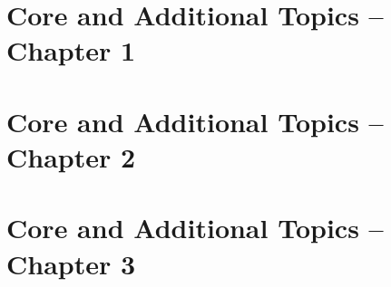 \documentclass[12pt, fleqn, openany, oneside]{studyGuide}
\begin{document}


\chapter{Core and Additional Topics -- Chapter 1}








\chapter{Core and Additional Topics -- Chapter 2}











\chapter{Core and Additional Topics -- Chapter 3}











\end{document}
